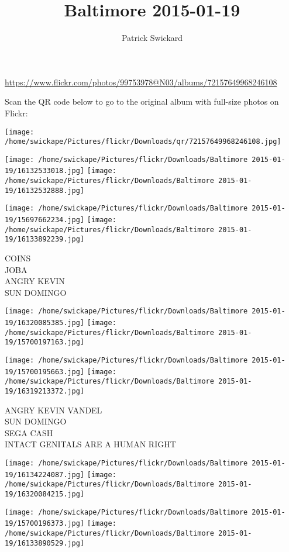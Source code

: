 \documentclass[10pt,letterpaper]{article}
\title{Baltimore 2015-01-19}
\author{Patrick Swickard}
\date{}
\begin{document}
\maketitle

\url{https://www.flickr.com/photos/99753978@N03/albums/72157649968246108}

Scan the QR code below to go to the original album with full-size photos on Flickr:

\texttt{[image: /home/swickape/Pictures/flickr/Downloads/qr/72157649968246108.jpg]}
\pagebreak

\texttt{[image: /home/swickape/Pictures/flickr/Downloads/Baltimore 2015-01-19/16132533018.jpg]}
\texttt{[image: /home/swickape/Pictures/flickr/Downloads/Baltimore 2015-01-19/16132532888.jpg]}

\texttt{[image: /home/swickape/Pictures/flickr/Downloads/Baltimore 2015-01-19/15697662234.jpg]}
\texttt{[image: /home/swickape/Pictures/flickr/Downloads/Baltimore 2015-01-19/16133892239.jpg]}

COINS\\
JOBA\\
ANGRY KEVIN\\
SUN DOMINGO
\pagebreak

\texttt{[image: /home/swickape/Pictures/flickr/Downloads/Baltimore 2015-01-19/16320085385.jpg]}
\texttt{[image: /home/swickape/Pictures/flickr/Downloads/Baltimore 2015-01-19/15700197163.jpg]}

\texttt{[image: /home/swickape/Pictures/flickr/Downloads/Baltimore 2015-01-19/15700195663.jpg]}
\texttt{[image: /home/swickape/Pictures/flickr/Downloads/Baltimore 2015-01-19/16319213372.jpg]}

ANGRY KEVIN VANDEL\\
SUN DOMINGO\\
SEGA CASH\\
INTACT GENITALS ARE A HUMAN RIGHT
\pagebreak

\texttt{[image: /home/swickape/Pictures/flickr/Downloads/Baltimore 2015-01-19/16134224087.jpg]}
\texttt{[image: /home/swickape/Pictures/flickr/Downloads/Baltimore 2015-01-19/16320084215.jpg]}

\texttt{[image: /home/swickape/Pictures/flickr/Downloads/Baltimore 2015-01-19/15700196373.jpg]}
\texttt{[image: /home/swickape/Pictures/flickr/Downloads/Baltimore 2015-01-19/16133890529.jpg]}
\end{document}
